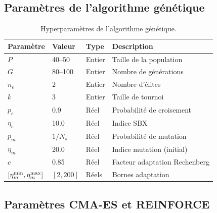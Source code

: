 \documentclass[12pt,a4paper]{article}
\begin{document}
\subsection{Paramètres de l'algorithme génétique}

\begin{table}[htbp]
\centering
\caption{Hyperparamètres de l'algorithme génétique.}
\label{tab:ga-params}
\begin{tabular}{llll}
\toprule
\textbf{Paramètre} & \textbf{Valeur} & \textbf{Type} & \textbf{Description} \\
\midrule
$P$ & 40--50 & Entier & Taille de la population \\
$G$ & 80--100 & Entier & Nombre de générations \\
$n_e$ & 2 & Entier & Nombre d'élites \\
$k$ & 3 & Entier & Taille de tournoi \\
$p_c$ & 0.9 & Réel & Probabilité de croisement \\
$\eta_c$ & 10.0 & Réel & Indice SBX \\
$p_m$ & $1/N_s$ & Réel & Probabilité de mutation \\
$\eta_m$ & 20.0 & Réel & Indice mutation (initial) \\
$c$ & 0.85 & Réel & Facteur adaptation Rechenberg \\
$[\eta_m^{\rm min}, \eta_m^{\rm max}]$ & $[2, 200]$ & Réels & Bornes adaptation \\
\bottomrule
\end{tabular}
\end{table}

\subsection{Paramètres CMA-ES et REINFORCE}
\end{document}
